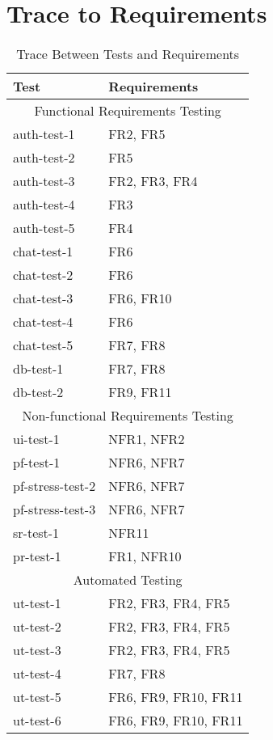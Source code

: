 \documentclass[12pt, titlepage]{article}
\begin{document}
	    \begin{table}[!htbp]
	    \section{Trace to Requirements}
			\begin{tabularx}{\textwidth}{p{3cm}X}
				\toprule
				Test & Requirements \\
				\midrule
				\multicolumn{2}{c}{Functional Requirements Testing} \\
				\midrule
				auth-test-1 & FR2, FR5 \\
                auth-test-2 & FR5\\
                auth-test-3 & FR2, FR3, FR4\\
                auth-test-4 & FR3\\
                auth-test-5 & FR4\\
                chat-test-1 & FR6\\
                chat-test-2 & FR6\\
                chat-test-3 & FR6, FR10\\
                chat-test-4 & FR6\\
                chat-test-5 & FR7, FR8\\
                db-test-1 & FR7, FR8\\
                db-test-2 & FR9, FR11\\
				\midrule
				\multicolumn{2}{c}{Non-functional Requirements Testing} \\
				\midrule
                ui-test-1 & NFR1, NFR2\\
                pf-test-1 & NFR6, NFR7\\
                pf-stress-test-2 & NFR6, NFR7\\
                pf-stress-test-3 & NFR6, NFR7\\
                sr-test-1 & NFR11\\
                pr-test-1 & FR1, NFR10\\
				\midrule
				\multicolumn{2}{c}{Automated Testing} \\
				\midrule
				ut-test-1 & FR2, FR3, FR4, FR5\\ %
				ut-test-2 & FR2, FR3, FR4, FR5\\ %
				ut-test-3 & FR2, FR3, FR4, FR5 \\ %
				ut-test-4 & FR7, FR8\\ %
				ut-test-5 & FR6, FR9, FR10, FR11\\ %
				ut-test-6 & FR6, FR9, FR10, FR11\\ %
				\bottomrule
			\end{tabularx}
			\caption{Trace Between Tests and Requirements}
			\makeatletter
			\def\rulecolor#1#{\CT@arc{#1}}
			\def\CT@arc#1#2{%
				\ifdim\baselineskip=\z@\noalign\fi
				{\gdef\CT@arc@{\color#1{#2}}}}
			\let\CT@arc@\relax
			\makeatother
			\label{Table}
		\end{table}
\end{document}
